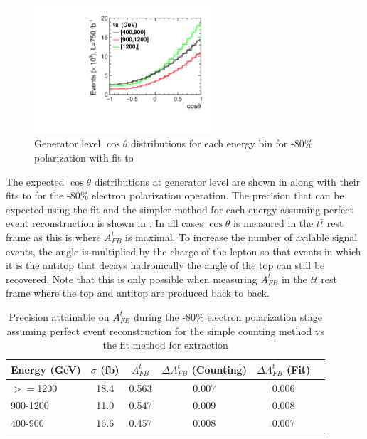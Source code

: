 \begin{figure}
  \centering
  \includegraphics[width=0.6\textwidth]{TopAnalysis/figures/GeneratorTheta.pdf}
  \caption[Generator level $\cos\theta$ distributions for each energy bin]{Generator level $\cos\theta$ distributions for each energy bin for -80\% polarization with fit to }
  \label{fig:mctheta}
\end{figure}

The expected $\cos\theta$ distributions at generator level are shown in  along with their fits to  for the -80\% electron polarization operation. The precision that can be expected using the fit and the simpler method for each energy assuming perfect event reconstruction is shown in . In all cases $\cos\theta$ is measured in the $t\bar{t}$ rest frame as this is where $A_{FB}^t$ is maximal. To increase the number of avilable signal events, the angle is multiplied by the charge of the lepton so that events in which it is the antitop that decays hadronically the angle of the top can still be recovered. Note that this is only possible when measuring $A_{FB}^t$ in the $t\bar{t}$ rest frame where the top and antitop are produced back to back.

\begin{table}
  \centering
  \begin{tabular}{l|c|c|c|c|c}
    \toprule
    Energy (GeV) &  $\sigma$ (fb)   & $A_{FB}^t$ & $\Delta A^t_{FB}$ (Counting) & $\Delta A_{FB}^t$ (Fit) \\
    \midrule
    $>=$1200 & 18.4  & 0.563 & 0.007 & 0.006 \\
    \midrule
    900-1200 & 11.0 & 0.547 & 0.009 & 0.008 \\
    \midrule
    400-900 & 16.6 & 0.457 & 0.008 & 0.007 \\
    \bottomrule
  \end{tabular}
  \caption{Precision attainable on $A_{FB}^t$ during the -80\% electron polarization stage assuming perfect event reconstruction for the simple counting method vs the fit method for extraction}
  \label{table:idealresults}
\end{table}



